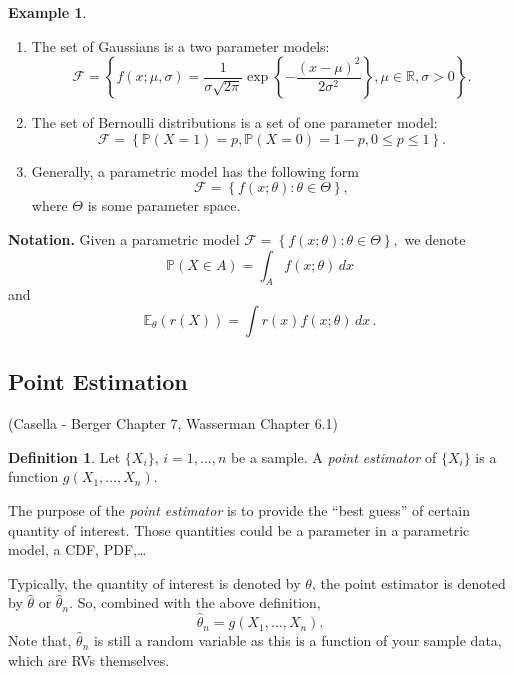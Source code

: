 \documentclass[
  openany]{book}
\theoremstyle{definition}
\newtheorem{definition}{Definition}[chapter]
\theoremstyle{definition}
\newtheorem{example}{Example}[chapter]
\theoremstyle{definition}
\theoremstyle{definition}
\theoremstyle{remark}
\begin{document}
\begin{example}
\leavevmode

\begin{enumerate}
\def\labelenumi{\arabic{enumi}.}
\item
  The set of Gaussians is a two parameter models:
  \[ \mathcal{F} = \left\{ f(x; \mu, \sigma) = \frac{1}{\sigma \sqrt{2 \pi}} \exp\left\{ -\frac{(x-\mu)^2}{2\sigma^2}  \right\}, \mu \in \mathbb{R}, \sigma > 0   \right\}. \]
\item
  The set of Bernoulli distributions is a set of one parameter model:
  \[ \mathcal{F} = \left\{ \mathbb{P}(X = 1) = p, \mathbb{P}(X = 0) = 1 -p, 0\leq p \leq 1   \right\}.\]
\item
  Generally, a parametric model has the following form
  \[\mathcal{F} = \left\{ f(x;\theta) : \theta \in \Theta  \right\} ,\]
  where \(\Theta\) is some parameter space.
\end{enumerate}

\end{example}

\textbf{Notation.}
Given a parametric model
\(\mathcal{F} = \left\{ f(x;\theta) : \theta \in \Theta  \right\} ,\)
we denote
\[ \mathbb{P}(X \in A ) = \int_A f(x;\theta) \, dx\]
and
\[ \mathbb{E}_\theta ( r(X)) = \int r(x) f(x;\theta) \, dx \,.\]

\subsection{Point Estimation}\label{point-estimation}

(Casella - Berger Chapter 7, Wasserman Chapter 6.1)

\begin{definition}
Let \(\{X_i\}\), \(i = 1, \dots, n\) be a sample.
A \emph{point estimator} of \(\{X_i\}\) is a function
\(g(X_1, \dots, X_n)\).
\end{definition}

The purpose of the \emph{point estimator} is to provide the ``best guess'' of certain quantity of interest.
Those quantities could be a parameter in a parametric model, a CDF, PDF,\ldots{}

Typically, the quantity of interest is denoted by \(\theta\), the point
estimator is denoted by \(\hat \theta\) or \(\hat \theta_n\).
So, combined with the above definition,
\[ \hat \theta_n = g(X_1, \dots, X_n).\]
Note that, \(\hat \theta_n\) is still a random variable as this is a function of
your sample data, which are RVs themselves.
\end{document}
